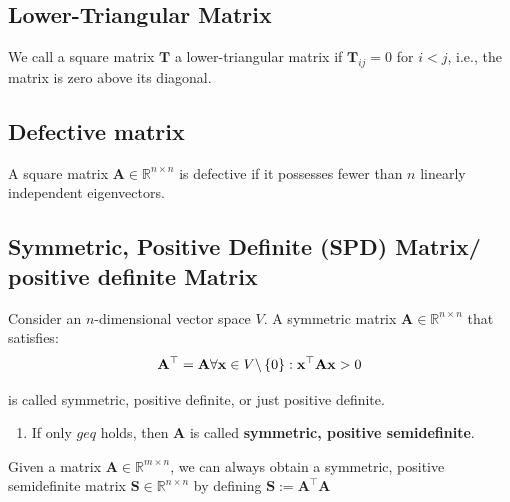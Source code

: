 
\subsection{Lower-Triangular Matrix \cite{mfml-1}}\label{Lower-Triangular Matrix}
We call a square matrix $\mathbf{T}$ a lower-triangular matrix if $\mathbf{T}_{ij} = 0$ for $i < j$, i.e., the matrix is zero above its diagonal.


\subsection{Defective matrix \cite{mfml-1}}\label{Defective matrix}
A square matrix $\mathbf{A} \in \mathbb{R}^{n\times n}$ is defective if it possesses fewer than $n$ linearly independent eigenvectors.


\subsection{Symmetric, Positive Definite (SPD) Matrix/ positive definite Matrix \cite{mfml-1}}\label{Symmetric, Positive Definite (SPD) Matrix/ positive definite Matrix}

Consider an $n$-dimensional vector space $V$. A symmetric matrix $\mathbf{A} \in \mathbb{R}^{n\times n}$ that satisfies:
\[
    \displaystyle
    \hfill
    \mathbf{A^\top = A}
    \hfill
    \forall \mathbf{x} \in V \backslash \dCurlyBrac{ 0 } : \mathbf{x^\top A x} > 0
    \hfill
\]

is called symmetric, positive definite, or just positive definite. 

\begin{enumerate}
    \item If only $geq$ holds, then $\mathbf{A}$ is called \textbf{symmetric, positive semidefinite}.
    
\end{enumerate}

\begin{theorem}
    Given a matrix $\mathbf{A} \in \mathbb{R}^{m\times n}$, we can always obtain a symmetric, positive semidefinite matrix $\mathbf{S} \in \mathbb{R}^{n\times n}$ by defining $\mathbf{S := A^\top A}$
\end{theorem}

